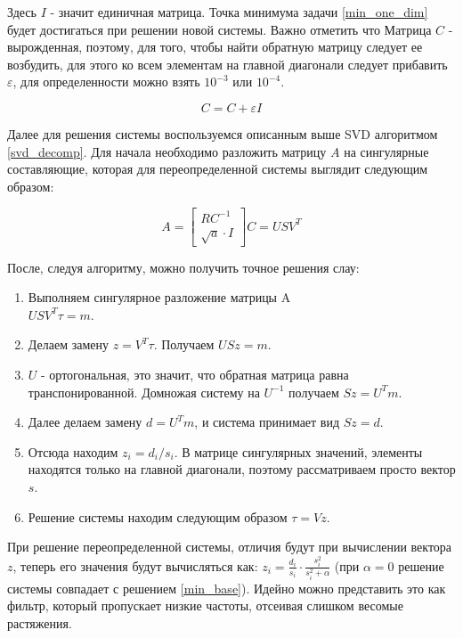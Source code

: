 \documentclass[a4paper,12pt]{diplom}
\renewcommand{\epsilon}{\varepsilon}
\begin{document}
Здесь $I$ - значит единичная матрица. 
Точка минимума задачи \eqref{min_one_dim} будет достигаться при решении новой системы. Важно отметить что Матрица
$C$ - вырожденная, поэтому, для того, чтобы найти обратную матрицу следует ее возбудить, для этого ко всем элементам
на главной диагонали следует прибавить $\epsilon$, для определенности можно взять $10^{-3}$ или $10^{-4}$.

\begin{equation}
   C = C + \epsilon I
\end{equation}

Далее для решения системы воспользуемся описанным выше SVD алгоритмом \eqref{svd_decomp}. Для начала необходимо разложить 
матрицу $A$ на сингулярные составляющие, которая для переопределенной системы выглядит следующим образом:

\begin{equation}
   A =
   \begin{bmatrix}
      RC^{-1} \\
      \sqrt{a} \cdot I
  \end{bmatrix}
  C = USV^{T}
\end{equation}

После, следуя алгоритму, можно получить точное решения слау:

\begin{enumerate}
    \item Выполняем сингулярное разложение матрицы A \\
    $USV^T \tau = m.$

    \item Делаем замену $z = V^T\tau$. Получаем $USz = m.$

    \item $U$ - ортогональная, это значит, что обратная матрица равна транспонированной. Домножая систему на $U^{-1}$ получаем $Sz=U^Tm$.

    \item Далее делаем замену $d=U^Tm$, и система принимает вид $Sz=d$.

    \item Отсюда находим $z_{i} = d_{i} / s_{i}$. В матрице сингулярных значений, элементы находятся только на главной диагонали, 
    поэтому рассматриваем просто вектор $s$.

    \item Решение системы находим следующим образом $\tau = Vz$.
\end{enumerate}

При решение переопределенной системы, отличия будут при вычислении вектора $z$, теперь его значения будут вычисляться как:
$z_{i} = \frac{d_{i}}{s_{i}} \cdot \frac{s^2_{i}}{s^2_{i} + \alpha}$ (при $\alpha = 0$ решение системы
совпадает с решением \eqref{min_base}). Идейно можно представить это как фильтр, который пропускает низкие частоты, отсеивая слишком 
весомые растяжения.
\end{document}
